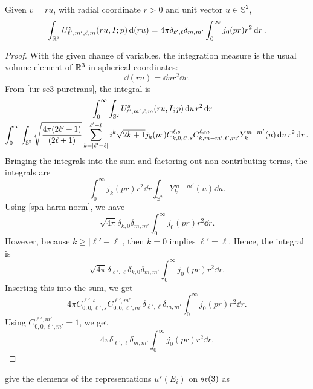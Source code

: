 \documentclass[../../main.tex]{subfiles}
\begin{document}
\begin{refsection}
	\begin{theorem}
		Given $v = r u$, with radial coordinate $r > 0$ and unit vector $u \in \mathbb{S}^2$,
		$$\int_{\mathbb{R}^3} U^s_{\ell',m',\ell,m}(r u, I; p) \dd(r u) = 4\pi \delta_{\ell',\ell} \delta_{m,m'} \int_0^\infty j_0(p r) r^2 \dd{r}.$$
	\end{theorem}
	\begin{proof}
		With the given change of variables, the integration measure is the usual volume element of $\mathbb{R}^3$ in spherical coordinates:
		$$\dd (r u) = \dd{u} r^2 \dd{r}.$$
		From \cref{iur-se3-puretrans}, the integral is
		\begin{multline*}
			\int_0^\infty \int_{\mathbb{S}^2} U^s_{\ell',m',\ell,m}(r u, I; p) \dd{u} r^2 \dd{r} = \\
			\int_0^\infty \int_{\mathbb{S}^2} \sqrt{\frac{4\pi (2\ell'+1)}{(2\ell+1)}} \sum_{k=|\ell' - \ell|}^{\ell' + \ell} i^k \sqrt{2k+1} j_k (p r) C^{\ell,s}_{k,0,\ell',s} C^{\ell,m}_{k,m-m',\ell',m'} Y^{m-m'}_k(u) \dd{u} r^2 \dd{r}.
		\end{multline*}
		Bringing the integrals into the sum and factoring out non-contributing terms, the integrals are
		$$\int_0^\infty j_k (p r) r^2 \dd{r} \int_{\mathbb{S}^2} Y^{m-m'}_k(u) \dd{u}.$$
		Using \cref{sph-harm-norm}, we have
		$$\sqrt{4\pi} \delta_{k,0} \delta_{m,m'} \int_0^\infty j_0 (p r) r^2 \dd{r}.$$
		However, because $k \ge |\ell' - \ell|$, then $k = 0$ implies $\ell'=\ell$.
		Hence, the integral is
		$$\sqrt{4\pi} \delta_{\ell',\ell}  \delta_{k,0} \delta_{m,m'} \int_0^\infty j_0(p r) r^2 \dd{r}.$$
		Inserting this into the sum, we get
		$$4\pi C^{\ell',s}_{0,0,\ell',s} C^{\ell',m'}_{0,0,\ell',m'} \delta_{\ell',\ell} \delta_{m,m'} \int_0^\infty j_0(p r) r^2 \dd{r}.$$
		Using $C^{\ell',m'}_{0,0,\ell',m'} = 1$, we get
		$$4\pi \delta_{\ell',\ell} \delta_{m,m'} \int_0^\infty j_0(p r) r^2 \dd{r}.$$
	\end{proof}

	\cite[Equations 12.109-12.114]{chirikjianStochasticModelsInformation2012} give the elements of the representations $u^s(E_i)$ on $\mathfrak{se} (3)$ as


\end{refsection}
\end{document}
